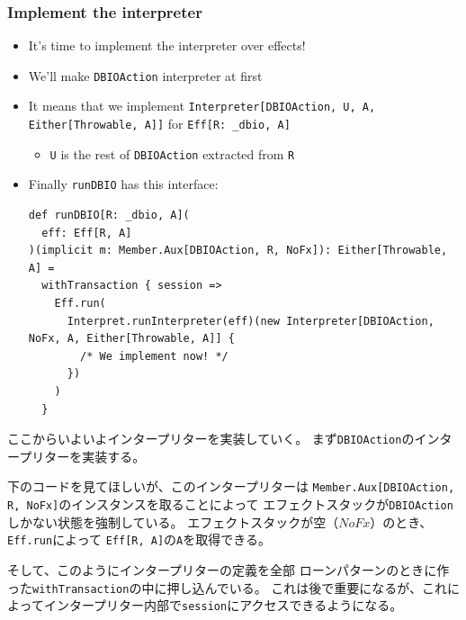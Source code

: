 \begin{frame}[fragile]
  \label{fra:define_runDBIO}
  \frametitle{Implement the interpreter}

  \pause
  \begin{itemize}
    \item<+-> It's time to implement the interpreter over
    effects!

    \item<+-> We'll make \lstinline|DBIOAction| interpreter
    at first

    \item<+-> It means that we implement
    \lstinline|Interpreter[DBIOAction, U, A, Either[Throwable, A]]| for
    \lstinline|Eff[R: _dbio, A]|
    \begin{itemize}
      \item \lstinline|U| is the rest of \lstinline|DBIOAction| extracted from \lstinline|R|
    \end{itemize}

    \item<+-> Finally \lstinline|runDBIO| has this interface:
\begin{lstlisting}[style=scala]
def runDBIO[R: _dbio, A](
  eff: Eff[R, A]
)(implicit m: Member.Aux[DBIOAction, R, NoFx]): Either[Throwable, A] =
  withTransaction { session =>
    Eff.run(
      Interpret.runInterpreter(eff)(new Interpreter[DBIOAction, NoFx, A, Either[Throwable, A]] {
        /* We implement now! */
      })
    )
  }
\end{lstlisting}
  \end{itemize}

  \begin{notes}
    \item ここからいよいよインタープリターを実装していく。
    まず\lstinline|DBIOAction|のインタープリターを実装する。

    \item 下のコードを見てほしいが、このインタープリターは
    \lstinline|Member.Aux[DBIOAction, R, NoFx]|のインスタンスを取ることによって
    エフェクトスタックが\lstinline|DBIOAction|しかない状態を強制している。
    エフェクトスタックが空（$NoFx$）のとき、\lstinline|Eff.run|によって
    \lstinline|Eff[R, A]|の\lstinline|A|を取得できる。

    \item そして、このようにインタープリターの定義を全部
    ローンパターンのときに作った\lstinline|withTransaction|の中に押し込んでいる。
    これは後で重要になるが、これによってインタープリター内部で\lstinline|session|にアクセスできるようになる。
  \end{notes}
\end{frame}

